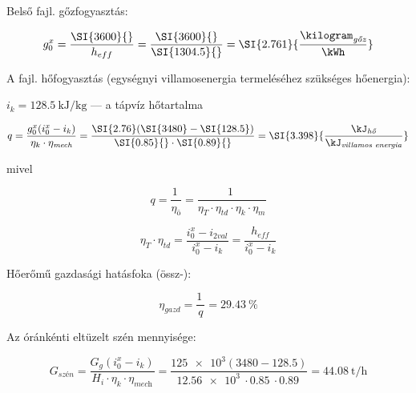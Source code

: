 \noindent Belső fajl. gőzfogyasztás:

\begin{equation}
	g_0^x = \dfrac{\SI{3600}{}}{h_{eff}} = \dfrac{\SI{3600}{}}{\SI{1304.5}{}} =  \SI{2.761}{\dfrac {\kilogram_{\textit{gőz}}} {\kWh}}
\end{equation}

\noindent A fajl. hőfogyasztás (egységnyi villamosenergia termeléséhez szükséges hőenergia):

\vspace{2mm}

$i_{k} = \SI{128.5}{\kJ\per\kilogram}$ --- a tápvíz hőtartalma

\vspace{2mm}

\begin{equation}
	q = \dfrac {{g_0^x}{(i_0^x - i_k)}} {\eta_{k} \cdot \eta_{\textit{mech}}} = \dfrac{\SI{2.76} (\SI{3480} - \SI{128.5})} {\SI{0.85}{} \cdot \SI{0.89}{}} = \SI{3.398}{\dfrac {\kJ_{\textit{hő}}} {\kJ_{\textit{villamos energia}}}}
\end{equation}

\noindent mivel
\vspace{2mm}

\begin{equation}
	q = \dfrac {\SI{1}{}} {\eta_{ö}} = \dfrac {\SI{1}{}} {\eta_{T} \cdot \eta_{\textit{td}} \cdot \eta_{k} \cdot \eta_{m}}
\end{equation}

\vspace{2mm}

\begin{equation}
	\eta_{T} \cdot \eta_{\textit{td}} = \dfrac {i_0^{x} - i_{\textit{2val}}} {i_0^{x} - i_{k}} = \dfrac {h_{\textit{eff}}} {i_0^{x} - i_{k}}
\end{equation}

\vspace{2mm}

\noindent Hőerőmű gazdasági hatásfoka (össz-):

\begin{equation}
	\eta_{\textit{gazd}} = \dfrac {\SI{1}{}} {q} = \SI{29.43}{\%}
\end{equation}

\vspace{2mm}

\noindent Az óránkénti eltüzelt szén mennyisége:

\begin{equation}
	G_{\textit{szén}} = \dfrac{{G_{g}}{(i_0^x - i_{k})}} {H_{i} \cdot \eta_{k} \cdot \eta_{\textit{mech}}} = \dfrac{\SI{125e3} (\SI{3480} - \SI{128.5})} {\SI{12.56e3}{} \cdot \SI{0.85}{} \cdot \SI{0.89}{}} = \SI{44.08}{\tonne\per\hour}
\end{equation}

